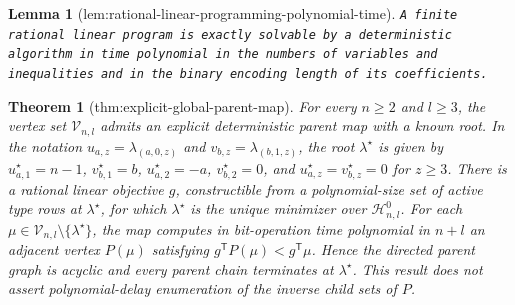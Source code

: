 \documentclass{article}
\newtheorem{theorem}{Theorem}
\newtheorem{lemma}{Lemma}
\begin{document}
\begin{lemma}[lem:rational-linear-programming-polynomial-time]\label{lem:rational-linear-programming-polynomial-time}
\texttt{A finite rational linear program is exactly solvable by a deterministic algorithm in time polynomial in the numbers of variables and inequalities and in the binary encoding length of its coefficients.}
\end{lemma}

\begin{theorem}[thm:explicit-global-parent-map]\label{thm:explicit-global-parent-map}
For every \(n\ge2\) and \(l\ge3\), the vertex set \(\mathcal V_{n,l}\) admits an explicit deterministic parent map with a known root. In the notation \(u_{a,z}=\lambda_{(a,0,z)}\) and \(v_{b,z}=\lambda_{(b,1,z)}\), the root \(\lambda^\star\) is given by \(u^\star_{a,1}=n-1\), \(v^\star_{b,1}=b\), \(u^\star_{a,2}=-a\), \(v^\star_{b,2}=0\), and \(u^\star_{a,z}=v^\star_{b,z}=0\) for \(z\ge3\). There is a rational linear objective \(g\), constructible from a polynomial-size set of active type rows at \(\lambda^\star\), for which \(\lambda^\star\) is the unique minimizer over \(\mathcal H^0_{n,l}\). For each \(\mu\in\mathcal V_{n,l}\setminus\{\lambda^\star\}\), the map computes in bit-operation time polynomial in \(n+l\) an adjacent vertex \(P(\mu)\) satisfying \(g^{\mathsf T}P(\mu)<g^{\mathsf T}\mu\). Hence the directed parent graph is acyclic and every parent chain terminates at \(\lambda^\star\). This result does not assert polynomial-delay enumeration of the inverse child sets of \(P\).
\end{theorem}
\end{document}
